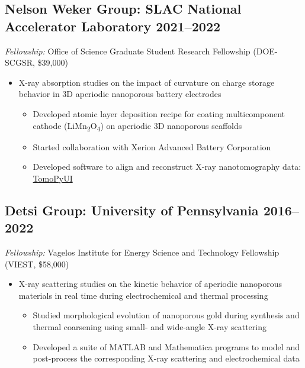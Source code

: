 \documentclass[11pt]{article} %
\begin{document}
\subsection{Nelson Weker Group: SLAC National Accelerator Laboratory \hspace*{\fill} 2021--2022}
\begin{flushleft}
  \textit{Fellowship:} Office of Science Graduate Student Research Fellowship (DOE-SCGSR, \$39,000)
\end{flushleft}
\begin{itemize}
  \item X-ray absorption studies on the impact of curvature on charge storage behavior in 3D aperiodic nanoporous battery electrodes
    \begin{itemize}
      \item Developed atomic layer deposition recipe for coating multicomponent cathode (LiMn\textsubscript{2}O\textsubscript{4}) on aperiodic 3D nanoporous scaffolds
      \item Started collaboration with Xerion Advanced Battery Corporation
      \item Developed software to align and reconstruct X-ray nanotomography data: \href{https://tomopyui.readthedocs.io/en/latest/}{TomoPyUI}
    \end{itemize}

\end{itemize}

\subsection{Detsi Group: University of Pennsylvania \hspace*{\fill} 2016--2022}
\begin{flushleft}
  \textit{Fellowship:} Vagelos Institute for Energy Science and Technology Fellowship (VIEST, \$58,000)
\end{flushleft}
\begin{itemize}
  \item X-ray scattering studies on the kinetic behavior of aperiodic nanoporous materials in real time during electrochemical and thermal processing
    \begin{itemize}
      \item Studied morphological evolution of nanoporous gold during synthesis and thermal coarsening using small- and wide-angle X-ray scattering
      \item Developed a suite of MATLAB and Mathematica programs to model and post-process the corresponding X-ray scattering and electrochemical data
    \end{itemize}
\end{itemize}
\end{document}
